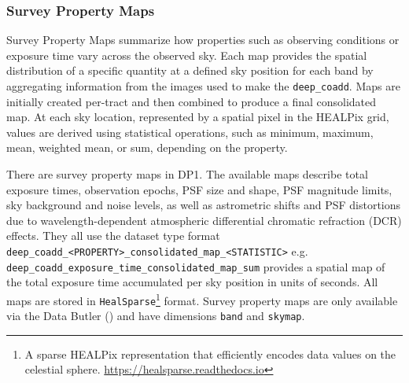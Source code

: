 \subsubsection{Survey Property Maps}
Survey Property Maps summarize how properties such as observing conditions or exposure time vary across the observed sky. 
Each map provides the spatial distribution of a specific quantity at a defined sky position for each band by aggregating information from the images used to make the \texttt{deep\_coadd}.
Maps are initially created per-tract and then combined to produce a final consolidated map.
At each sky location, represented by a spatial pixel in the \gls{HEALPix} grid, values are derived using statistical operations, such as minimum, maximum, mean, weighted mean, or sum, depending on the property.

There are \nsurveypropertymaps survey property maps in DP1.
The available maps describe total exposure times, observation epochs, PSF size and shape, PSF magnitude limits, sky background and noise levels, as well as astrometric shifts and PSF distortions due to wavelength-dependent atmospheric differential chromatic refraction (DCR) effects.
They all use the dataset type  format \texttt{deep\_coadd\_<PROPERTY>\_consolidated\_map\_<STATISTIC>} 
e.g. \texttt{deep\_coadd\_exposure\_time\_consolidated\_map\_sum} provides a spatial map of the total exposure time accumulated per
sky position in units of seconds. 
All maps are stored in \texttt{HealSparse}\footnote{A sparse HEALPix 
representation that efficiently encodes data values on the celestial sphere. \url{https://healsparse.readthedocs.io}}\citep{2005ApJ...622..759G} format. 
Survey property maps are only available via the Data Butler () and  have dimensions \texttt{band} and \texttt{skymap}.


